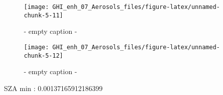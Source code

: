 \documentclass[
  10pt,
  a4paper,oneside]{article}
\begin{document}
\begin{figure}[H]

{\centering \texttt{[image: GHI\_enh\_07\_Aerosols\_files/figure-latex/unnamed-chunk-5-11]} 

}

\caption{ - empty caption - }\label{fig:unnamed-chunk-5-11}
\end{figure}
\begin{figure}[H]

{\centering \texttt{[image: GHI\_enh\_07\_Aerosols\_files/figure-latex/unnamed-chunk-5-12]} 

}

\caption{ - empty caption - }\label{fig:unnamed-chunk-5-12}
\end{figure}

SZA min : 0.00137165912186399
\end{document}
